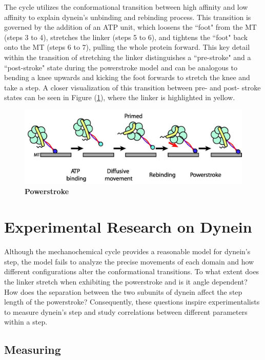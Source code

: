 The cycle utilizes the conformational transition between high affinity and low affinity to explain dynein's unbinding and rebinding process. This transition is governed by the addition of an ATP unit, which loosens the ``foot" from the MT (steps 3 to 4), stretches the linker (steps 5 to 6), and tightens the ``foot" back onto the MT (steps 6 to 7), pulling the whole protein forward. This key detail within the transition of stretching the linker distinguishes a ``pre-stroke" and a ``post-stroke" state during the powerstroke model and can be analogous to bending a knee upwards and kicking the foot forwards to stretch the knee and take a step. A closer visualization of this transition between pre- and post- stroke states can be seen in Figure (\ref{fig:Powerstroke}), where the linker is highlighted in yellow.  

\begin{figure}[H]
	\centering
	\includegraphics[width=1\columnwidth]{Figures/powerstroke.jpeg}
	\caption[Powerstroke]{\textbf{Powerstroke}  \cite{Carter2010communication} }
	\label{fig:Powerstroke}
\end{figure}


\section{Experimental Research on Dynein}

Although the mechanochemical cycle provides a reasonable model for dynein's step, the model fails to analyze the precise movements of each domain and how different configurations alter the conformational transitions. To what extent does the linker stretch when exhibiting the powerstroke and is it angle dependent? How does the separation between the two subunits of dynein affect the step length of the powerstroke? Consequently, these questions inspire experimentalists to measure dynein's step and study correlations between different parameters within a step.

\subsection{Measuring}

